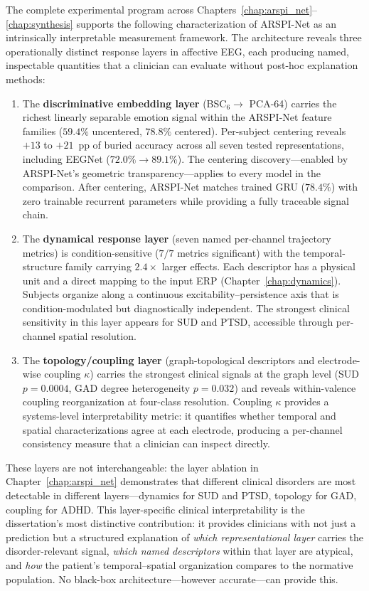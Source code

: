 The complete experimental program across Chapters~\ref{chap:arspi_net}--\ref{chap:synthesis} supports the following characterization of ARSPI-Net as an intrinsically interpretable measurement framework. The architecture reveals three operationally distinct response layers in affective EEG, each producing named, inspectable quantities that a clinician can evaluate without post-hoc explanation methods:
\begin{enumerate}
    \item The \textbf{discriminative embedding layer} (BSC$_6 \to$ PCA-64) carries the richest linearly separable emotion signal within the ARSPI-Net feature families ($59.4\%$ uncentered, $78.8\%$ centered). Per-subject centering reveals $+13$ to $+21$~pp of buried accuracy across all seven tested representations, including EEGNet ($72.0\% \to 89.1\%$). The centering discovery---enabled by ARSPI-Net's geometric transparency---applies to every model in the comparison. After centering, ARSPI-Net matches trained GRU ($78.4\%$) with zero trainable recurrent parameters while providing a fully traceable signal chain.
    \item The \textbf{dynamical response layer} (seven named per-channel trajectory metrics) is condition-sensitive ($7/7$ metrics significant) with the temporal-structure family carrying $2.4\times$ larger effects. Each descriptor has a physical unit and a direct mapping to the input ERP (Chapter~\ref{chap:dynamics}). Subjects organize along a continuous excitability--persistence axis that is condition-modulated but diagnostically independent. The strongest clinical sensitivity in this layer appears for SUD and PTSD, accessible through per-channel spatial resolution.
    \item The \textbf{topology/coupling layer} (graph-topological descriptors and electrode-wise coupling $\kappa$) carries the strongest clinical signals at the graph level (SUD $p = 0.0004$, GAD degree heterogeneity $p = 0.032$) and reveals within-valence coupling reorganization at four-class resolution. Coupling $\kappa$ provides a systems-level interpretability metric: it quantifies whether temporal and spatial characterizations agree at each electrode, producing a per-channel consistency measure that a clinician can inspect directly.
\end{enumerate}
These layers are not interchangeable: the layer ablation in Chapter~\ref{chap:arspi_net} demonstrates that different clinical disorders are most detectable in different layers---dynamics for SUD and PTSD, topology for GAD, coupling for ADHD. This layer-specific clinical interpretability is the dissertation's most distinctive contribution: it provides clinicians with not just a prediction but a structured explanation of \emph{which representational layer} carries the disorder-relevant signal, \emph{which named descriptors} within that layer are atypical, and \emph{how} the patient's temporal--spatial organization compares to the normative population. No black-box architecture---however accurate---can provide this.

